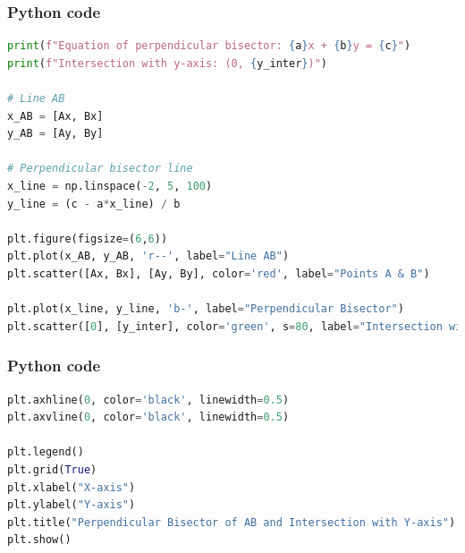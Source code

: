 \documentclass{beamer}
\begin{document}
\begin{frame}[fragile]
    \frametitle{Python code}

    \begin{lstlisting}[language=Python]
print(f"Equation of perpendicular bisector: {a}x + {b}y = {c}")
print(f"Intersection with y-axis: (0, {y_inter})")

# Line AB
x_AB = [Ax, Bx]
y_AB = [Ay, By]

# Perpendicular bisector line
x_line = np.linspace(-2, 5, 100)
y_line = (c - a*x_line) / b

plt.figure(figsize=(6,6))
plt.plot(x_AB, y_AB, 'r--', label="Line AB")
plt.scatter([Ax, Bx], [Ay, By], color='red', label="Points A & B")

plt.plot(x_line, y_line, 'b-', label="Perpendicular Bisector")
plt.scatter([0], [y_inter], color='green', s=80, label="Intersection with y-axis")
           \end{lstlisting}
\end{frame}
\begin{frame}[fragile]
    \frametitle{Python code}

    \begin{lstlisting}[language=Python]
plt.axhline(0, color='black', linewidth=0.5)
plt.axvline(0, color='black', linewidth=0.5)

plt.legend()
plt.grid(True)
plt.xlabel("X-axis")
plt.ylabel("Y-axis")
plt.title("Perpendicular Bisector of AB and Intersection with Y-axis")
plt.show()

    \end{lstlisting}
\end{frame}
\end{document}
